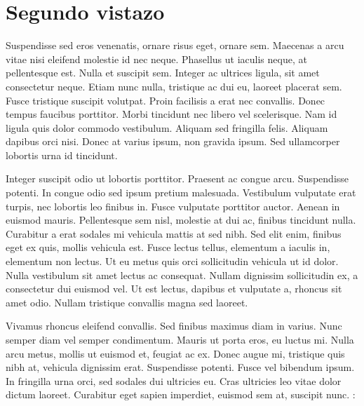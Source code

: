 \section{Segundo vistazo}
Suspendisse sed eros venenatis, ornare risus eget, ornare sem. Maecenas a arcu vitae nisi eleifend molestie id nec neque. Phasellus ut iaculis neque, at pellentesque est. Nulla et suscipit sem. Integer ac ultrices ligula, sit amet consectetur neque. Etiam nunc nulla, tristique ac dui eu, laoreet placerat sem. Fusce tristique suscipit volutpat. Proin facilisis a erat nec convallis. Donec tempus faucibus porttitor. Morbi tincidunt nec libero vel scelerisque. Nam id ligula quis dolor commodo vestibulum. Aliquam sed fringilla felis. Aliquam dapibus orci nisi. Donec at varius ipsum, non gravida ipsum. Sed ullamcorper lobortis urna id tincidunt.

Integer suscipit odio ut lobortis porttitor. Praesent ac congue arcu. Suspendisse potenti. In congue odio sed ipsum pretium malesuada. Vestibulum vulputate erat turpis, nec lobortis leo finibus in. Fusce vulputate porttitor auctor. Aenean in euismod mauris. Pellentesque sem nisl, molestie at dui ac, finibus tincidunt nulla. Curabitur a erat sodales mi vehicula mattis at sed nibh. Sed elit enim, finibus eget ex quis, mollis vehicula est. Fusce lectus tellus, elementum a iaculis in, elementum non lectus. Ut eu metus quis orci sollicitudin vehicula ut id dolor. Nulla vestibulum sit amet lectus ac consequat. Nullam dignissim sollicitudin ex, a consectetur dui euismod vel. Ut est lectus, dapibus et vulputate a, rhoncus sit amet odio. Nullam tristique convallis magna sed laoreet.

Vivamus rhoncus eleifend convallis. Sed finibus maximus diam in varius. Nunc semper diam vel semper condimentum. Mauris ut porta eros, eu luctus mi. Nulla arcu metus, mollis ut euismod et, feugiat ac ex. Donec augue mi, tristique quis nibh at, vehicula dignissim erat. Suspendisse potenti. Fusce vel bibendum ipsum. In fringilla urna orci, sed sodales dui ultricies eu. Cras ultricies leo vitae dolor dictum laoreet. Curabitur eget sapien imperdiet, euismod sem at, suscipit nunc. :
